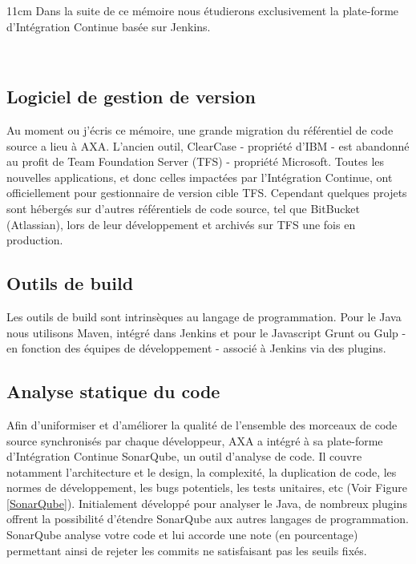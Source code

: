     \begin {boxedminipage} {11cm}
      Dans la suite de ce mémoire nous étudierons exclusivement la plate-forme d'Intégration Continue basée sur Jenkins.
    \end {boxedminipage}\\

    \subsection{Logiciel de gestion de version}
    Au moment ou j'écris ce mémoire, une grande migration du référentiel de code source a lieu à AXA. L'ancien outil, ClearCase - propriété d'IBM - est abandonné au profit de Team Foundation Server (TFS) - propriété Microsoft. Toutes les nouvelles applications, et donc celles impactées par l'Intégration Continue, ont officiellement pour gestionnaire de version cible TFS. Cependant quelques projets sont hébergés sur d'autres référentiels de code source, tel que BitBucket (Atlassian), lors de leur développement et archivés sur TFS une fois en production.

    \subsection{Outils de build}
    Les outils de build sont intrinsèques au langage de programmation. Pour le Java nous utilisons Maven, intégré dans Jenkins et pour le Javascript Grunt ou Gulp - en fonction des équipes de développement - associé à Jenkins via des plugins.

    \subsection{Analyse statique du code}
    Afin d'uniformiser et d'améliorer la qualité de l'ensemble des morceaux de code source synchronisés par chaque développeur, AXA a intégré à sa plate-forme d'Intégration Continue SonarQube, un outil d'analyse de code. Il couvre notamment l'architecture et le design, la complexité, la duplication de code, les normes de développement, les bugs potentiels, les tests unitaires, etc (Voir Figure \ref{SonarQube}). Initialement développé pour analyser le Java, de nombreux plugins offrent la possibilité d'étendre SonarQube aux autres langages de programmation. SonarQube analyse votre code et lui accorde une note (en pourcentage) permettant ainsi de rejeter les commits ne satisfaisant pas les seuils fixés.\\

